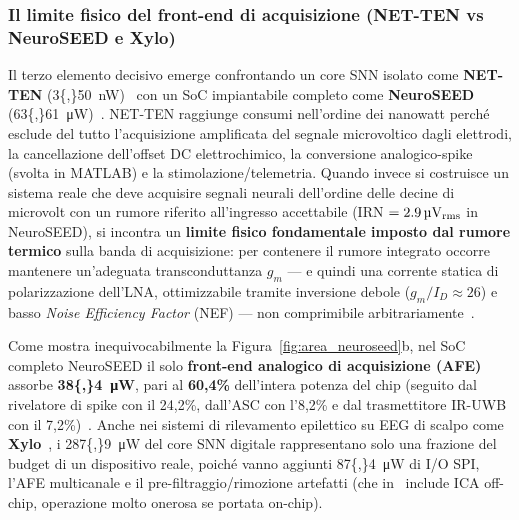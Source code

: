 \subsubsection{Il limite fisico del front-end di acquisizione (NET-TEN vs NeuroSEED e Xylo)}
Il terzo elemento decisivo emerge confrontando un core SNN isolato come \textbf{NET-TEN} (\SI{3{,}50}{\nano\watt})~\cite{ronchini2023} con un SoC impiantabile completo come \textbf{NeuroSEED} (\SI{63{,}61}{\micro\watt})~\cite{wu2026}. NET-TEN raggiunge consumi nell'ordine dei nanowatt perché esclude del tutto l'acquisizione amplificata del segnale microvoltico dagli elettrodi, la cancellazione dell'offset DC elettrochimico, la conversione analogico-spike (svolta in MATLAB) e la stimolazione/telemetria. Quando invece si costruisce un sistema reale che deve acquisire segnali neurali dell'ordine delle decine di microvolt con un rumore riferito all'ingresso accettabile (IRN $= \SI{2{,}9}{\micro\volt\textsubscript{rms}}$ in NeuroSEED), si incontra un \textbf{limite fisico fondamentale imposto dal rumore termico} sulla banda di acquisizione: per contenere il rumore integrato occorre mantenere un'adeguata transconduttanza $g_m$ — e quindi una corrente statica di polarizzazione dell'LNA, ottimizzabile tramite inversione debole ($g_m/I_D \approx 26$) e basso \emph{Noise Efficiency Factor} (NEF) — non comprimibile arbitrariamente~\cite{wu2026}.

Come mostra inequivocabilmente la Figura~\ref{fig:area_neuroseed}b, nel SoC completo NeuroSEED il solo \textbf{front-end analogico di acquisizione (AFE)} assorbe \textbf{\SI{38{,}4}{\micro\watt}}, pari al \textbf{60,4\%} dell'intera potenza del chip (seguito dal rivelatore di spike con il 24,2\%, dall'ASC con l'8,2\% e dal trasmettitore IR-UWB con il 7,2\%)~\cite{wu2026}. Anche nei sistemi di rilevamento epilettico su EEG di scalpo come \textbf{Xylo}~\cite{li2024}, i \SI{287{,}9}{\micro\watt} del core SNN digitale rappresentano solo una frazione del budget di un dispositivo reale, poiché vanno aggiunti \SI{87{,}4}{\micro\watt} di I/O SPI, l'AFE multicanale e il pre-filtraggio/rimozione artefatti (che in~\cite{li2024} include ICA off-chip, operazione molto onerosa se portata on-chip).

